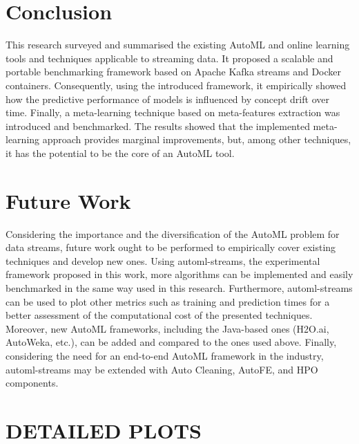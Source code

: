 \documentclass{sig-alternate-br}
\begin{document}
\section{Conclusion}

This research surveyed and summarised the existing AutoML and online learning tools and techniques applicable to streaming data. It proposed a scalable and portable benchmarking framework based on Apache Kafka streams and Docker containers. Consequently, using the introduced framework, it empirically showed how the predictive performance of models is influenced by concept drift over time. Finally, a meta-learning technique based on meta-features extraction was introduced and benchmarked. The results showed that the implemented meta-learning approach provides marginal improvements, but, among other techniques, it has the potential to be the core of an AutoML tool.

\section{Future Work}

Considering the importance and the diversification of the AutoML problem for data streams, future work ought to be performed to empirically cover existing techniques and develop new ones. Using automl-streams, the experimental framework proposed in this work, more algorithms can be implemented and easily benchmarked in the same way used in this research. Furthermore, automl-streams can be used to plot other metrics such as training and prediction times for a better assessment of the computational cost of the presented techniques. Moreover, new AutoML frameworks, including the Java-based ones (H2O.ai, AutoWeka, etc.), can be added and compared to the ones used above. Finally, considering the need for an end-to-end AutoML framework in the industry, automl-streams may be extended with Auto Cleaning, AutoFE, and HPO components.



  
%

\newpage

\appendix
\section{DETAILED PLOTS}
\label{appendix:a}
\end{document}
